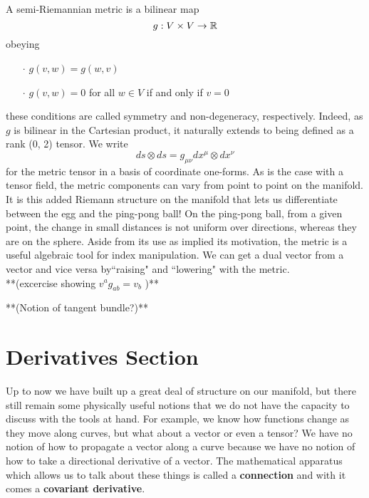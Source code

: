 A semi-Riemannian metric is a bilinear map 
\begin{equation*}
	g: V\times V \to \mathbb{R}
\end{equation*}
obeying 
\begin{enumerate}
	\item[$\cdot$] $g(v, w) = g(w, v)$
	\item[$\cdot$] $g(v, w) = 0$ for all $w \in V$ if and only if $v = 0$  
\end{enumerate}
these conditions are called symmetry and non-degeneracy, respectively.  Indeed, as $g$ is bilinear in the Cartesian product, it naturally extends to being defined as a rank (0, 2) tensor.  We write
\begin{equation*}
	ds\otimes ds = g_{\mu\nu}dx^{\mu}\otimes dx^{\nu}
\end{equation*}
for the metric tensor in a basis of coordinate one-forms.  As is the case with a tensor field, the metric components can vary from point to point on the manifold.  It is this added Riemann structure on the manifold that lets us differentiate between the egg and the ping-pong ball!   On the ping-pong ball, from a given point, the change in small distances is not uniform over directions, whereas they are on the sphere.  Aside from its use as implied its motivation, the metric is a useful algebraic tool for index manipulation.  We can get a dual vector from a vector and vice versa by``raising" and ``lowering" with the metric.\\

**(excercise showing $v^a g_{ab} = v_b$ )**

**(Notion of tangent bundle?)**
 
 \section*{Derivatives Section}
 Up to now we have built up a great deal of structure on our manifold, but there still remain some physically useful notions that we do not have the capacity to discuss with the tools at hand.  For example, we know how functions change as they move along curves, but what about a vector or even a tensor?  We have no notion of how to propagate a vector along a curve because we have no notion of how to take a directional derivative of a vector.  The mathematical apparatus which allows us to talk about these things is called a \textbf{connection} and with it comes a \textbf{covariant derivative}.\\
 
